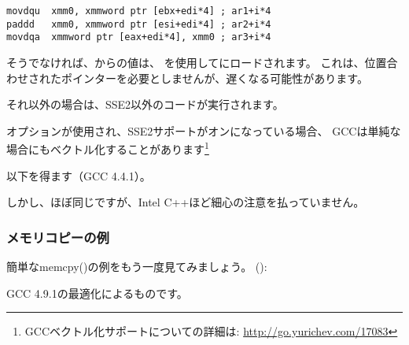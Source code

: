 \begin{lstlisting}[style=customasmx86]
movdqu  xmm0, xmmword ptr [ebx+edi*4] ; ar1+i*4
paddd   xmm0, xmmword ptr [esi+edi*4] ; ar2+i*4
movdqa  xmmword ptr [eax+edi*4], xmm0 ; ar3+i*4
\end{lstlisting}

そうでなければ、からの値は、 \MOVDQU を使用してにロードされます。
これは、位置合わせされたポインターを必要としませんが、遅くなる可能性があります。



それ以外の場合は、SSE2以外のコードが実行されます。


\newcommand{\URLGCCVEC}{\url{http://go.yurichev.com/17083}}

\Othree オプションが使用され、SSE2サポートがオンになっている場合、
GCCは単純な場合にもベクトル化することがあります\footnote{GCCベクトル化サポートについての詳細は: \URLGCCVEC}

以下を得ます（GCC 4.4.1）。



しかし、ほぼ同じですが、Intel C++ほど細心の注意を払っていません。

\subsubsection{メモリコピーの例}
\label{vec_memcpy}

簡単なmemcpy()の例をもう一度見てみましょう。
():



GCC 4.9.1の最適化によるものです。


